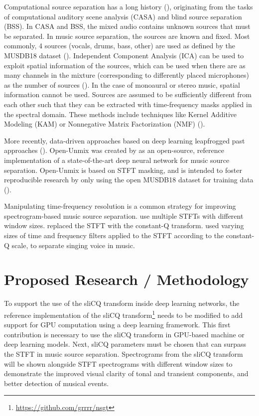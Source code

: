 \documentclass[letter,12pt]{article}
\begin{document}
Computational source separation has a long history (\cite{musicsepsurvey}), originating from the tasks of computational auditory scene analysis (CASA) and blind source separation (BSS). In CASA and BSS, the mixed audio contains unknown sources that must be separated. In music source separation, the sources are known and fixed. Most commonly, 4 sources (vocals, drums, bass, other) are used as defined by the MUSDB18 dataset (\cite{musdb18}). Independent Component Analysis (ICA) can be used to exploit spatial information of the sources, which can be used when there are as many channels in the mixture (corresponding to differently placed microphones) as the number of sources (\cite{musicsepsurvey, musicsepgood}). In the case of monoaural or stereo music, spatial information cannot be used. Sources are assumed to be sufficiently different from each other such that they can be extracted with time-frequency masks applied in the spectral domain. These methods include techniques like Kernel Additive Modeling (KAM) or Nonnegative Matrix Factorization (NMF) (\cite{musicsepsurvey, musicsepgood}).

More recently, data-driven approaches based on deep learning leapfrogged past approaches (\cite{sisec2018}). Open-Unmix was created by \textcite{umx} as an open-source, reference implementation of a state-of-the-art deep neural network for music source separation. Open-Unmix is based on STFT masking, and is intended to foster reproducible research by only using the open MUSDB18 dataset for training data (\cite{musdb18, musdb18hq}).

Manipulating time-frequency resolution is a common strategy for improving spectrogram-based music source separation. \textcite{fitzgerald1, driedger} use multiple STFTs with different window sizes. \textcite{fitzgerald2, cqtseparation, bettermusicsep} replaced the STFT with the constant-Q transform. \textcite{plumbley2} used varying sizes of time and frequency filters applied to the STFT according to the constant-Q scale, to separate singing voice in music.

\section{Proposed Research / Methodology}

To support the use of the sliCQ transform inside deep learning networks, the reference implementation of the sliCQ transform\footnote{\url{https://github.com/grrrr/nsgt}} needs to be modified to add support for GPU computation using a deep learning framework. This first contribution is necessary to use the sliCQ transform in GPU-based machine or deep learning models. Next, sliCQ parameters must be chosen that can surpass the STFT in music source separation. Spectrograms from the sliCQ transform will be shown alongside STFT spectrograms with different window sizes to demonstrate the improved visual clarity of tonal and transient components, and better detection of musical events.
\end{document}
